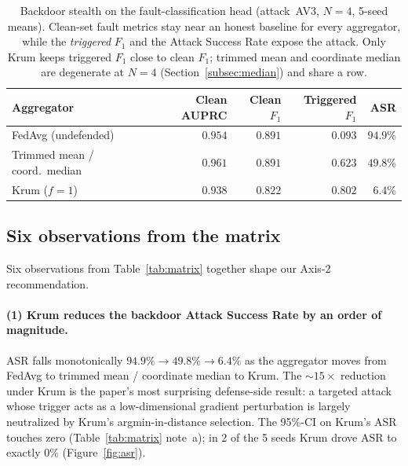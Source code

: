 \documentclass[a4paper,fleqn,doubleblind]{cas-sc}
\newcommand{\tblhead}{\rowcolor{tblHeadBg}}
\newcommand{\zebra}{\rowcolors{2}{tblAltBg}{white}}
\newcommand{\tblhead}{}
\newcommand{\zebra}{}
\begin{document}
\begin{table}[pos=tbp]
\centering
\footnotesize
\setlength{\tabcolsep}{6pt}
\renewcommand{\arraystretch}{1.2}
\caption{Backdoor stealth on the fault-classification head
(attack~AV3, $N = 4$, 5-seed means). Clean-set fault metrics stay near
an honest baseline for every aggregator, while the \emph{triggered}
$F_1$ and the Attack Success Rate expose the attack. Only Krum keeps
triggered $F_1$ close to clean $F_1$; trimmed mean and coordinate
median are degenerate at $N = 4$ (Section~\ref{subsec:median}) and
share a row.}
\label{tab:stealth}
\zebra
\begin{tabular}{@{}l r r r r@{}}
\toprule
\tblhead
Aggregator & Clean AUPRC & Clean $F_1$ & Triggered $F_1$ & ASR \\
\midrule
FedAvg (undefended)           & $0.954$ & $0.891$ & $0.093$ & $94.9\%$ \\
Trimmed mean / coord.\ median & $0.961$ & $0.891$ & $0.623$ & $49.8\%$ \\
Krum ($f = 1$)                & $0.938$ & $0.822$ & $0.802$ & $\phantom{0}6.4\%$ \\
\bottomrule
\end{tabular}
\end{table}

\subsection{Six observations from the matrix}
\label{sec:axis2-results-observations}

Six observations from Table~\ref{tab:matrix} together shape our
Axis-2 recommendation.

\paragraph{(1) Krum reduces the backdoor Attack Success Rate by an
order of magnitude.}
ASR falls monotonically $94.9\% \to 49.8\% \to 6.4\%$ as the
aggregator moves from FedAvg to trimmed mean / coordinate median to
Krum. The $\sim 15\times$ reduction under Krum is the paper's most
surprising defense-side result: a targeted attack whose trigger acts
as a low-dimensional gradient perturbation is largely neutralized by
Krum's argmin-in-distance selection. The 95\%-CI on Krum's ASR
touches zero (Table~\ref{tab:matrix} note~a); in 2 of the 5 seeds
Krum drove ASR to exactly $0\%$ (Figure~\ref{fig:asr}).
\end{document}
